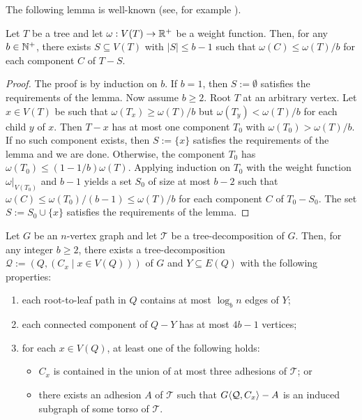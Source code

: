 The following lemma is well-known (see, for example \cite{}).

\begin{lem}\label{bag_separator}
  Let $T$ be a tree and let $\omega:V(T)\to\mathbb{R}^+$ be a weight function.  Then, for any $b\in\mathbb{N}^+$, there exists $S\subseteq V(T)$ with $|S|\le b-1$ such that $\omega(C)\le \omega(T)/b$ for each component $C$ of $T-S$.
\end{lem}

\begin{proof}
  The proof is by induction on $b$.  If $b=1$, then $S:=\emptyset$ satisfies the requirements of the lemma.  Now assume $b\ge 2$. Root $T$ at an arbitrary vertex. Let $x\in V(T)$ be such that $\omega(T_x) \ge \omega(T)/b$ but $\omega(T_y) < \omega(T)/b$ for each child $y$ of $x$.  Then $T-x$ has at most one component $T_0$ with $\omega(T_0) > \omega(T)/b$.  If no such component exists, then $S:=\{x\}$ satisfies the requirements of the lemma and we are done.  Otherwise, the component $T_0$ has $\omega(T_0)\le (1-1/b)\omega(T)$.  Applying induction on $T_0$ with the weight function $\omega|_{V(T_0)}$ and $b-1$ yields a set $S_0$ of size at most $b-2$ such that $\omega(C)\le\omega(T_0)/(b-1)\le \omega(T)/b$ for each component $C$ of $T_0-S_0$.  The set $S:=S_0\cup\{x\}$ satisfies the requirements of the lemma.
\end{proof}

\begin{lem}\label{log_b_td}
  Let $G$ be an $n$-vertex graph and let $\mathcal{T}$ be a tree-decomposition of $G$.  Then, for any integer $b\ge 2$,  there exists a tree-decomposition $\mathcal{Q}:=(Q,(C_x\mid x\in V(Q)))$ of $G$ and $Y\subseteq E(Q)$ with the following properties:
  \begin{enumerate}[nosep,nolistsep,label=\rm(\alph*)]
    \item\label{req:height} each root-to-leaf path in $Q$ contains at most $\log_b n$ edges of $Y$;
    \item\label{req:subtree_size} each connected component of $Q-Y$ has at most $4b-1$ vertices;
    \item\label{req:subtree_torso_apex} for each $x\in V(Q)$, at least one of the following holds: 
    \begin{itemize}[nosep,nolistsep]
      \item\label{req:three_adhesions} $C_x$ is contained in the union of at most three adhesions of $\mathcal{T}$; or
      \item\label{req:adhesion_torso} there exists an adhesion $A$ of $\mathcal{T}$ such that ${G}\langle{\mathcal{Q},C_x}\rangle-A$ is an induced subgraph of some torso of $\mathcal{T}$.
    \end{itemize}
  \end{enumerate}
\end{lem}

